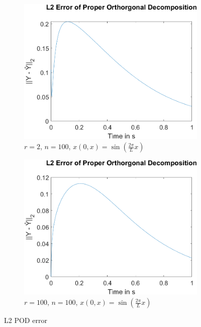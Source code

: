 \begin{figure}[H]
\begin{subfigure}[b]{0.5\textwidth}
\centering
\includegraphics[width=\textwidth]{images/L2_Proper Orthorgonal Decomposition_2_100sin}
\caption{ $r=2$, $n=100$, $x(0, x) = \sin(\frac{2\pi}{L}x)$}
\label{fig:fig-pod-2-100-sina}
\end{subfigure}
\begin{subfigure}[b]{0.5\textwidth}
\centering
\includegraphics[width=\textwidth]{images/L2_Proper Orthorgonal Decomposition_100_100sin}
\caption{$r=100$, $n=100$, $x(0, x) = \sin(\frac{2\pi}{L}x)$}
\label{fig:fig-pod-100-100-sinb}
\end{subfigure}
\label{fig-pod-100-sin}
\caption{L2 POD error}
\end{figure}


